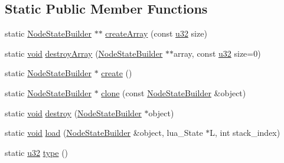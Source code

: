 \subsection*{Static Public Member Functions}
\begin{DoxyCompactItemize}
\item 
static \mbox{\hyperlink{classnjli_1_1_node_state_builder}{Node\+State\+Builder}} $\ast$$\ast$ \mbox{\hyperlink{classnjli_1_1_node_state_builder_a3e2258c717172451b12ccfc4d25c1af7}{create\+Array}} (const \mbox{\hyperlink{_util_8h_a10e94b422ef0c20dcdec20d31a1f5049}{u32}} size)
\item 
static \mbox{\hyperlink{_thread_8h_af1e856da2e658414cb2456cb6f7ebc66}{void}} \mbox{\hyperlink{classnjli_1_1_node_state_builder_a6f19074faac45e8363007f4475a9742c}{destroy\+Array}} (\mbox{\hyperlink{classnjli_1_1_node_state_builder}{Node\+State\+Builder}} $\ast$$\ast$array, const \mbox{\hyperlink{_util_8h_a10e94b422ef0c20dcdec20d31a1f5049}{u32}} size=0)
\item 
static \mbox{\hyperlink{classnjli_1_1_node_state_builder}{Node\+State\+Builder}} $\ast$ \mbox{\hyperlink{classnjli_1_1_node_state_builder_a928c7c469900b4b2246bbd8fcd0d5762}{create}} ()
\item 
static \mbox{\hyperlink{classnjli_1_1_node_state_builder}{Node\+State\+Builder}} $\ast$ \mbox{\hyperlink{classnjli_1_1_node_state_builder_a5f79a27baf7673246dfa24f7638f80a3}{clone}} (const \mbox{\hyperlink{classnjli_1_1_node_state_builder}{Node\+State\+Builder}} \&object)
\item 
static \mbox{\hyperlink{_thread_8h_af1e856da2e658414cb2456cb6f7ebc66}{void}} \mbox{\hyperlink{classnjli_1_1_node_state_builder_a5439375062a47f970758dc92d56cf1c2}{destroy}} (\mbox{\hyperlink{classnjli_1_1_node_state_builder}{Node\+State\+Builder}} $\ast$object)
\item 
static \mbox{\hyperlink{_thread_8h_af1e856da2e658414cb2456cb6f7ebc66}{void}} \mbox{\hyperlink{classnjli_1_1_node_state_builder_ab7b368f9b1f86b4dd745686c1ac850e7}{load}} (\mbox{\hyperlink{classnjli_1_1_node_state_builder}{Node\+State\+Builder}} \&object, lua\+\_\+\+State $\ast$L, int stack\+\_\+index)
\item 
static \mbox{\hyperlink{_util_8h_a10e94b422ef0c20dcdec20d31a1f5049}{u32}} \mbox{\hyperlink{classnjli_1_1_node_state_builder_aaa3c3aab88316d8bc21c28de0c3e4ae4}{type}} ()
\end{DoxyCompactItemize}
